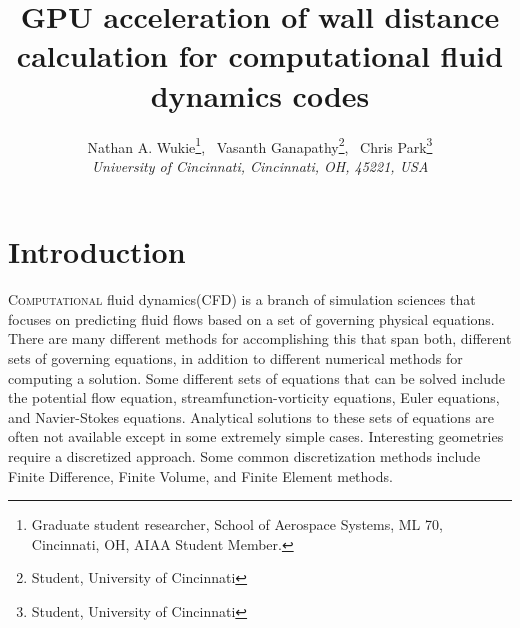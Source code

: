 \documentclass[]{aiaa-tc}%
\title{GPU acceleration of wall distance calculation for
   computational fluid dynamics codes}
\author{
   Nathan A. Wukie\thanks{Graduate student researcher, School of Aerospace Systems, ML 70, 
     Cincinnati, OH, AIAA Student Member.},
   \ Vasanth Ganapathy\thanks{Student, University of Cincinnati},
   \ Chris Park\thanks{Student, University of Cincinnati} \\
   {\normalsize\itshape
     University of Cincinnati, Cincinnati, OH, 45221, USA}\\
 }
\begin{document}
\maketitle




\section{Introduction}
\lettrine[nindent=0pt]{C}{omputational} fluid dynamics(CFD) is a branch of
simulation sciences that focuses on predicting fluid flows based on a
set of governing physical equations. There are many different methods
for accomplishing this that span both, different sets of governing
equations, in addition to different numerical methods for computing a
solution. Some different sets of equations that can be solved include
the potential flow equation, streamfunction-vorticity equations, Euler
equations, and Navier-Stokes equations. Analytical solutions to these
sets of equations are often not available except in some extremely
simple cases. Interesting geometries require a discretized
approach. Some common discretization methods include Finite Difference,
Finite Volume, and Finite Element methods. 
\end{document}
